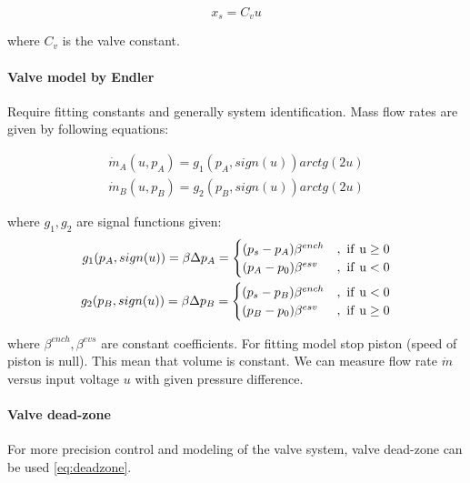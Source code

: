 \documentclass[class=article, crop=false]{standalone}
\begin{document}
\begin{equation}
    x_s = C_v u
    \label{eq:x_s}
\end{equation}

where $C_v$ is the valve constant.

\paragraph{Valve model by Endler}
Require fitting constants and generally system identification.
Mass flow rates are given by following equations:


\begin{equation}
    \begin{aligned}
        \dot{m}_A(u, p_A) = g_1(p_A, sign(u))arctg(2u) \\
        \dot{m}_B(u, p_B) = g_2(p_B, sign(u))arctg(2u)
    \end{aligned}
\end{equation}

where $g_1, g_2$ are signal functions given:
\begin{equation}
    \begin{aligned}
        g_1(p_A, sign(u)) = \beta \Delta p_A = 
        \begin{cases}
            (p_s - p_A) \beta^{ench} &, \rm \ if\  u \ge 0 \\
            (p_A - p_0) \beta^{esv} &, \rm \ if\  u  < 0 \\
        \end{cases} \\
        g_2(p_B, sign(u)) = \beta \Delta p_B = 
        \begin{cases}
            (p_s - p_B) \beta^{ench} &, \rm \ if\  u < 0 \\
            (p_B - p_0) \beta^{esv} &, \rm \ if\  u \ge 0 \\
        \end{cases}
    \end{aligned}
    \label{eq:valve_3}
\end{equation}

where $\beta^{ench}, \beta^{evs}$ are constant coefficients.
For fitting model stop piston (speed of piston is null). This mean that
volume is constant. We can measure flow rate $\dot{m}$ versus input voltage
$u$ with given pressure difference.

\paragraph{Valve dead-zone}
For more precision control and modeling of the valve system, valve
dead-zone can be used \ref{eq:deadzone}.
\end{document}
